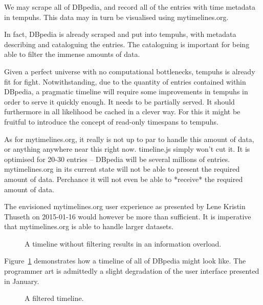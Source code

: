 We may scrape all of DBpedia, and record all of the entries with time metadata 
in tempuhs. This data may in turn be visualised using mytimelines.org.

In fact, DBpedia is already scraped and put into tempuhs, with metadata 
describing and cataloguing the entries. The cataloguing is important for being
able to filter the immense amounts of data.

Given a perfect universe with no computational bottlenecks, tempuhs is already 
fit for fight. Notwithstanding, due to the quantity of entries contained 
within DBpedia, a pragmatic timeline will require some improvements in tempuhs 
in order to serve it quickly enough. It needs to be partially served. It 
should furthermore in all likelihood be cached in a clever way. For this it 
might be fruitful to introduce the concept of read-only timespans to tempuhs.

As for mytimelines.org, it really is not up to par to handle this amount of 
data, or anything anywhere near this right now. timeline.js simply won't cut 
it. It is optimised for 20-30 entries\cite{timelinejsfaq} -- DBpedia will be 
several millions of entries. mytimelines.org in its current state will not be 
able to present the required amount of data. Perchance it will not even be 
able to *receive* the required amount of data.

The envisioned mytimelines.org user experience as presented by Lene Kristin 
Thuseth on 2015-01-16 would however be more than sufficient. It is imperative 
that mytimelines.org is able to handle larger datasets.

\begin{figure}[H]
  \centering
  \begin{scale}{0.3}
    
  \end{scale}
  \caption{A timeline without filtering results in an information overload.}
  \label{fig:overload}
\end{figure}

Figure~\ref{fig:overload} demonstrates how a timeline of all of DBpedia might 
look like. The programmer art is admittedly a slight degradation of the user 
interface presented in January.

\begin{figure}[H]
  \centering
  \begin{scale}{0.3}
    
  \end{scale}
  \caption{A filtered timeline.}
  \label{fig:filtered}
\end{figure}

